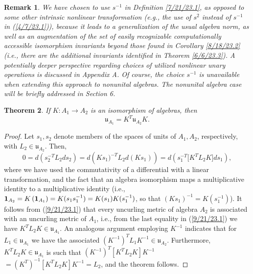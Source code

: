\documentclass{amsart}
\numberwithin{equation}{section}
\newtheorem{theorem}{Theorem}
\newtheorem{remark}[theorem]{Remark}
\theoremstyle{definition}
\numberwithin{theorem}{section}
\begin{document}
   
\begin{remark} {\rm  We have chosen to use $s^{-1}$ in Definition \ref{7/21/23.1}, as opposed to some other intrinsic nonlinear transformation (e.g., the use of $s^2$ instead of $s^{-1}$ in (\ref{4/7/23.1})), because it leads to a generalization of the usual algebra norm, as well as an augmentation of the set of easily recognizable computationally accessible isomorphism invariants beyond those found in Corollary \ref{8/18/23.2} (i.e., there are the additional invariants identified in Theorem \ref{6/6/23.3}).  A potentially deeper perspective regarding choices of utilized nonlinear unary operations is discussed in Appendix A.   Of course, the choice $s^{-1}$ is unavailable when extending this approach to nonunital algebras.  The nonunital algebra case will be briefly addressed in Section 6.} \end{remark}


\begin{theorem} \label{6/6/23.1} If $K:A_1\rightarrow A_2$ is an isomorphism of algebras, then \begin{equation}\label{5/23/23.1} \mathfrak{u}_{A_1} = K^T \mathfrak{u}_{A_2} K. \end{equation} \end{theorem}

\begin{proof} Let $s_1,s_2$ denote members of the spaces of units of $A_1,A_2$, respectively, with $L_2\in \mathfrak{u}_{A_2}$.  Then, \begin{equation} 0 = d\left(s_2^{-T}L_2 ds_2\right) =  d\left(Ks_1)^{-T}L_2 d(Ks_1)\right) =d\left(s_1^{-T} \big[K^T L_2K\big]ds_1\right), \label{9/21/23.1}  \end{equation} where we have used the commutativity of a differential with a linear transformation, and the fact that an algebra isomorphism maps a multiplicative identity to a multiplicative identity (i.e., ${\bf 1}_{A_2} = K\left(\mathbf{1}_{A_1}\right) = K(s_1s_1^{-1}) = K(s_1)K(s_1^{-1})$, so that $(Ks_1)^{-1} = K(s_1^{-1})$).  It follows from (\ref{9/21/23.1}) that every uncurling metric of algebra $A_2$ is associated with an uncurling metric of $A_1$, i.e., from the last equality in (\ref{9/21/23.1}) we have  $K^TL_2K\in\mathfrak{u}_{A_1}$.  An analogous argument employing $K^{-1}$ indicates that for $L_1\in\mathfrak{u}_{A_1}$ we have the associated $(K^{-1})^T L_1 K^{-1} \in \mathfrak{u}_{A_2}$.  Furthermore, $K^T L_2K\in\mathfrak{u}_{A_1}$ is such that $(K^{-1})^T [K^T L_2 K]K^{-1}$  $= (K^T)^{-1} [K^T L_2 K]K^{-1} = L_2$, and the theorem follows. 
\end{proof}
\end{document}
